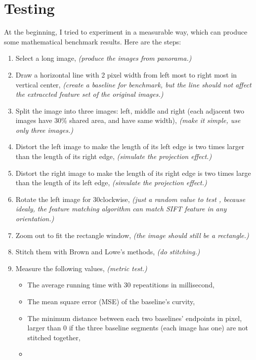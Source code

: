 \documentclass[10pt,twocolumn,letterpaper]{article}
\begin{document}
\section{Testing}
At the beginning, I tried to experiment in a measurable way, which can produce some mathematical benchmark results. Here are the steps:
\begin{enumerate}
    \item Select a long image, \textit{(produce the images from panorama.)}
    \item Draw a horizontal line with 2 pixel width from left most to right most in vertical center, \textit{(create a baseline for benchmark, but the line should not affect the extraccted feature set of the original images.)}
    \item Split the image into three images: left, middle and right (each adjacent two images have 30\% shared area, and have same width), \textit{(make it simple, use only three images.)}
    \item Distort the left image to make the length of its left edge is two times larger than the length of its right edge, \textit{(simulate the projection effect.)}
    \item Distort the right image to make the length of its right edge is two times large than the length of its left edge, \textit{(simulate the projection effect.)}
    \item Rotate the left image for 30\degree clockwise, \textit{(just a random value to test , because idealy, the feature matching algorithm can match SIFT feature in any orientation.)}
    \item Zoom out to fit the rectangle window, \textit{(the image should still be a rectangle.)}
    \item Stitch them with Brown and Lowe's methods, \textit{(do stitching.)}
    \item Measure the following values, \textit{(metric test.)} 
    \begin{itemize}
        \item The average running time with 30 repeatitions in millisecond,
        \item The mean square error (MSE) of the baseline's curvity,
        \item The minimum distance between each two baselines' endpoints in pixel, larger than 0 if the three baseline segments (each image has one) are not stitched together,
        \item 
    \end{itemize}
\end{enumerate}
\end{document}
